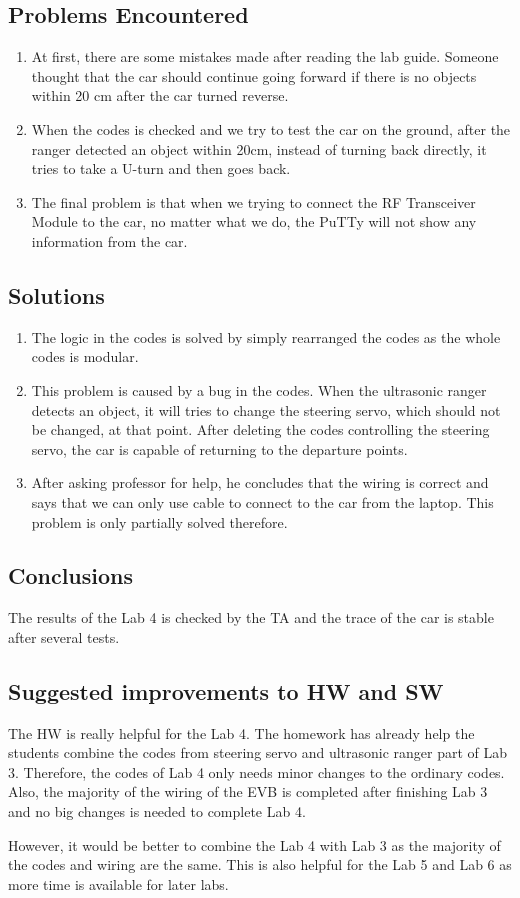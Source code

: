 \documentclass[12pt]{article}
\begin{document}
\subsection{Problems Encountered}
\begin{enumerate}
\item At first, there are some mistakes made after reading the lab guide. Someone thought that the car should continue going forward if there is no objects within 20 cm after the car turned reverse.
\item When the codes is checked and we try to test the car on the ground, after the ranger detected an object within 20cm, instead of turning back directly, it tries to take a U-turn and then goes back. 
\item The final problem is that when we trying to connect the RF Transceiver Module to the car, no matter what we do, the PuTTy will not show any information from the car.
\end{enumerate}
\subsection{Solutions}
\begin{enumerate}
\item The logic in the codes is solved by simply rearranged the codes as the whole codes is modular.
\item This problem is caused by a bug in the codes. When the ultrasonic ranger detects an object, it will tries to change the steering servo, which should not be changed, at that point. After deleting the codes controlling the steering servo, the car is capable of returning to the departure points.
\item After asking professor for help, he concludes that the wiring is correct and says that we can only use cable to connect to the car from the laptop. This problem is only partially solved therefore.
\end{enumerate}
\subsection{Conclusions}
The results of the Lab 4 is checked by the TA and the trace of the car is stable after several tests.
\subsection{Suggested improvements to HW and SW}
The HW is really helpful for the Lab 4. The homework has already help the students combine the codes from steering servo and ultrasonic ranger part of Lab 3. Therefore, the codes of Lab 4 only needs minor changes to the ordinary codes. Also, the majority of the wiring of the EVB is completed after finishing Lab 3 and no big changes is needed to complete Lab 4. \par
However, it would be better to combine the Lab 4 with Lab 3 as the majority of the codes and wiring are the same. This is also helpful for the Lab 5 and Lab 6 as more time is available for later labs. 
\newpage
\end{document}
